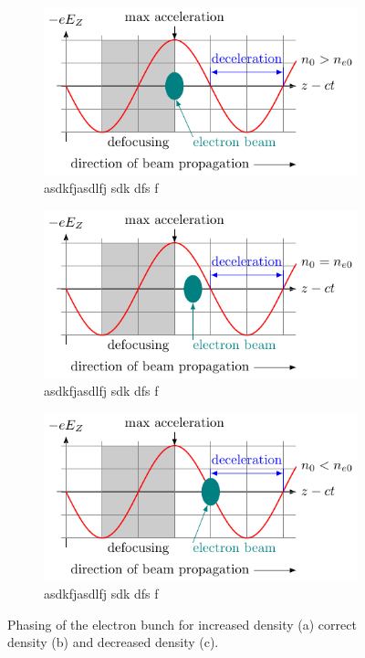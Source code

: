 \begin{figure}[tb]
	\centering
	\begin{subfigure}{\linewidth}
		\centering
		\includegraphics[width=0.9\linewidth]{figures/phases-a.pdf}
		\caption{asdkfjasdlfj sdk dfs f}
	\end{subfigure}
	\begin{subfigure}{\linewidth}
		\centering
		\includegraphics[width=0.9\linewidth]{figures/phases-b.pdf}
		\caption{asdkfjasdlfj sdk dfs f}
	\end{subfigure}
	\begin{subfigure}{\linewidth}
		\centering
		\includegraphics[width=0.9\linewidth]{figures/phases-c.pdf}
		\caption{asdkfjasdlfj sdk dfs f}
	\end{subfigure}
	\caption{
		Phasing of the electron bunch for increased density (a) correct density
		(b) and decreased density (c). \cite{wiedemann2007particle}
	}
	\label{fig:phases}
\end{figure}

